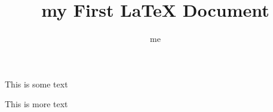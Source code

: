 \documentclass{article}
\author{me}
\title{my First {\LaTeX} Document}
\begin{document}
\maketitle

This is some text

This is more text
\end{document}
